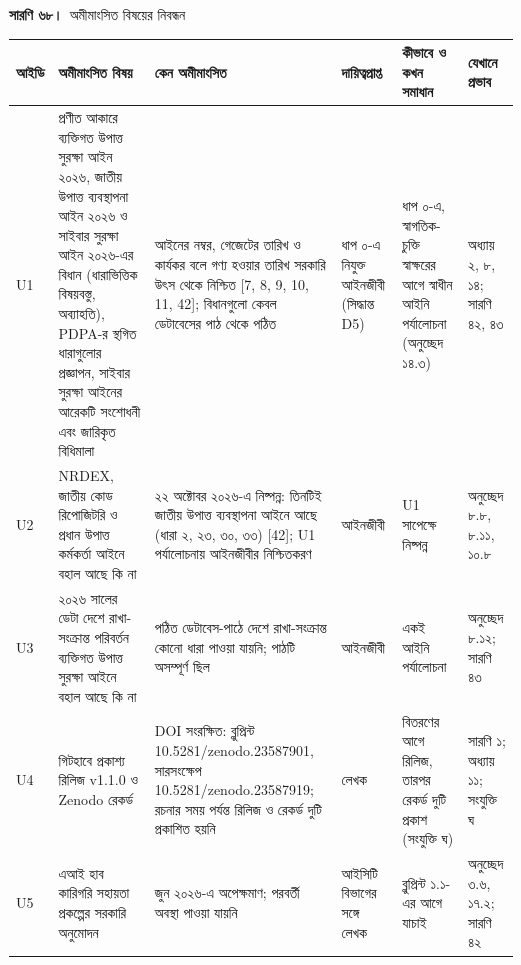 \documentclass[border=10pt]{standalone}
\begin{document}
\begin{minipage}{22cm}
{\large\bfseries সারণি ৬৮।}\ {\large অমীমাংসিত বিষয়ের নিবন্ধন}\par\vspace{7pt}
\small
{}
\begin{tabularx}{\linewidth}{@{}>{\hsize=0.340\hsize\raggedright\arraybackslash}X>{\hsize=1.472\hsize\raggedright\arraybackslash}X>{\hsize=1.245\hsize\raggedright\arraybackslash}X>{\hsize=0.906\hsize\raggedright\arraybackslash}X>{\hsize=1.132\hsize\raggedright\arraybackslash}X>{\hsize=0.906\hsize\raggedright\arraybackslash}X@{}}
\arrayrulecolor{bapilrule}\toprule
\rowcolor{white}\textbf{আইডি} & \textbf{অমীমাংসিত বিষয়} & \textbf{কেন অমীমাংসিত} & \textbf{দায়িত্বপ্রাপ্ত} & \textbf{কীভাবে ও কখন সমাধান} & \textbf{যেখানে প্রভাব} \\
\midrule
U1 & প্রণীত আকারে ব্যক্তিগত উপাত্ত সুরক্ষা আইন ২০২৬, জাতীয় উপাত্ত ব্যবস্থাপনা আইন ২০২৬ ও সাইবার সুরক্ষা আইন ২০২৬-এর বিধান (ধারাভিত্তিক বিষয়বস্তু, অব্যাহতি), PDPA-র স্থগিত ধারাগুলোর প্রজ্ঞাপন, সাইবার সুরক্ষা আইনের আরেকটি সংশোধনী এবং জারিকৃত বিধিমালা & আইনের নম্বর, গেজেটের তারিখ ও কার্যকর বলে গণ্য হওয়ার তারিখ সরকারি উৎস থেকে নিশ্চিত [7, 8, 9, 10, 11, 42]; বিধানগুলো কেবল ডেটাবেসের পাঠ থেকে পঠিত & ধাপ ০-এ নিযুক্ত আইনজীবী (সিদ্ধান্ত D5) & ধাপ ০-এ, স্বাগতিক-চুক্তি স্বাক্ষরের আগে স্বাধীন আইনি পর্যালোচনা (অনুচ্ছেদ ১৪.৩) & অধ্যায় ২, ৮, ১৪; সারণি ৪২, ৪৩ \\
U2 & NRDEX, জাতীয় কোড রিপোজিটরি ও প্রধান উপাত্ত কর্মকর্তা আইনে বহাল আছে কি না & ২২ অক্টোবর ২০২৬-এ নিষ্পন্ন: তিনটিই জাতীয় উপাত্ত ব্যবস্থাপনা আইনে আছে (ধারা ২, ২৩, ৩০, ৩৩) [42]; U1 পর্যালোচনায় আইনজীবীর নিশ্চিতকরণ & আইনজীবী & U1 সাপেক্ষে নিষ্পন্ন & অনুচ্ছেদ ৮.৮, ৮.১১, ১০.৮ \\
U3 & ২০২৬ সালের ডেটা দেশে রাখা-সংক্রান্ত পরিবর্তন ব্যক্তিগত উপাত্ত সুরক্ষা আইনে বহাল আছে কি না & পঠিত ডেটাবেস-পাঠে দেশে রাখা-সংক্রান্ত কোনো ধারা পাওয়া যায়নি; পাঠটি অসম্পূর্ণ ছিল & আইনজীবী & একই আইনি পর্যালোচনা & অনুচ্ছেদ ৮.১২; সারণি ৪৩ \\
U4 & গিটহাবে প্রকাশ্য রিলিজ v1.1.0 ও Zenodo রেকর্ড & DOI সংরক্ষিত: ব্লুপ্রিন্ট 10.5281/\allowbreak{}zenodo.23587901, সারসংক্ষেপ 10.5281/\allowbreak{}zenodo.23587919; রচনার সময় পর্যন্ত রিলিজ ও রেকর্ড দুটি প্রকাশিত হয়নি & লেখক & বিতরণের আগে রিলিজ, তারপর রেকর্ড দুটি প্রকাশ (সংযুক্তি ঘ) & সারণি ১; অধ্যায় ১১; সংযুক্তি ঘ \\
U5 & এআই হাব কারিগরি সহায়তা প্রকল্পের সরকারি অনুমোদন & জুন ২০২৬-এ অপেক্ষমাণ; পরবর্তী অবস্থা পাওয়া যায়নি & আইসিটি বিভাগের সঙ্গে লেখক & ব্লুপ্রিন্ট ১.১-এর আগে যাচাই & অনুচ্ছেদ ৩.৬, ১৭.২; সারণি ৪২ \\

\end{tabularx}
\end{minipage}
\end{document}
